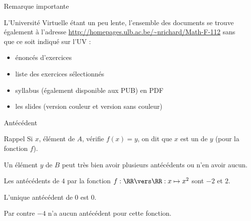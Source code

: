 

\begin{frame}{Remarque importante}
  \begin{center}
    L'Université Virtuelle étant un peu lente, l'ensemble des documents se trouve également à l'adresse \url{http://homepages.ulb.ac.be/~nrichard/Math-F-112} sans que ce soit indiqué sur l'UV :
    \begin{itemize}[<+->]
    \item énoncés d'exercices
    \item liste des exercices sélectionnés
    \item syllabus (également disponible aux PUB) en PDF
    \item les slides (version couleur et version sans couleur)
    \end{itemize}
  \end{center}
\end{frame}

\begin{frame}{Antécédent}
  \begin{block}{Rappel}
    Si $x$, élément de $A$, vérifie $f(x)=y$, on dit que $x$ est un  de $y$ (pour la fonction $f$). \pause

    Un élément $y$ de $B$ peut très bien avoir plusieurs antécédents ou n'en avoir aucun.
  \end{block}

  \begin{example}
    Les antécédents de $4$ par la fonction $f : \RR \vers \RR : x \mapsto x^2$ sont $-2$ et $2$. \pause

    L'unique antécédent de $0$ est $0$.\pause

    Par contre $-4$ n'a aucun antécédent pour cette fonction.
  \end{example}
\end{frame}

